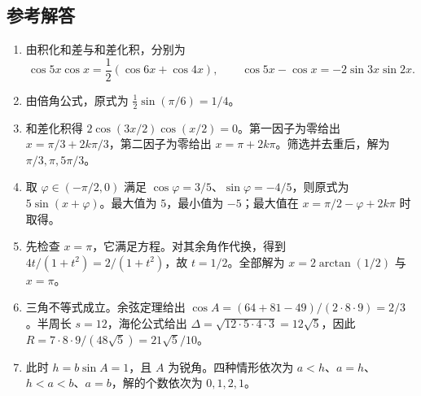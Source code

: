 \documentclass[UTF8,12pt,a4paper,fontset=fandol]{ctexart}
\begin{document}
\subsection{参考解答}

\begin{enumerate}
  \item 由积化和差与和差化积，分别为
  \[
    \cos5x\cos x=\frac12(\cos6x+\cos4x),\qquad
    \cos5x-\cos x=-2\sin3x\sin2x.
  \]
  \item 由倍角公式，原式为 $\tfrac12\sin(\pi/6)=1/4$。
  \item 和差化积得 $2\cos(3x/2)\cos(x/2)=0$。第一因子为零给出 $x=\pi/3+2k\pi/3$，第二因子为零给出 $x=\pi+2k\pi$。筛选并去重后，解为 $\pi/3,\pi,5\pi/3$。
  \item 取 $\varphi\in(-\pi/2,0)$ 满足 $\cos\varphi=3/5$、$\sin\varphi=-4/5$，则原式为 $5\sin(x+\varphi)$。最大值为 $5$，最小值为 $-5$；最大值在 $x=\pi/2-\varphi+2k\pi$ 时取得。
  \item 先检查 $x=\pi$，它满足方程。对其余角作代换，得到 $4t/(1+t^2)=2/(1+t^2)$，故 $t=1/2$。全部解为 $x=2\arctan(1/2)$ 与 $x=\pi$。
  \item 三角不等式成立。余弦定理给出 $\cos A=(64+81-49)/(2\cdot8\cdot9)=2/3$。半周长 $s=12$，海伦公式给出 $\Delta=\sqrt{12\cdot5\cdot4\cdot3}=12\sqrt5$，因此 $R=7\cdot8\cdot9/(48\sqrt5)=21\sqrt5/10$。
  \item 此时 $h=b\sin A=1$，且 $A$ 为锐角。四种情形依次为 $a<h$、$a=h$、$h<a<b$、$a=b$，解的个数依次为 $0,1,2,1$。
\end{enumerate}
\end{document}
